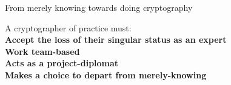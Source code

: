 \begin{frame}{From merely knowing towards doing cryptography}
  \raggedleft
  \begin{minipage}{.45\pagewidth}
    \centering
    A cryptographer of practice must:
    \\[1.3em] \textbf{Accept the loss of their singular status as an expert}
    \\[1.3em] \textbf{Work team-based}
    \\[1.3em] \textbf{Acts as a project-diplomat}
    \\[1.3em] \textbf{Makes a choice to depart from merely-knowing}
  \end{minipage}
\end{frame}

